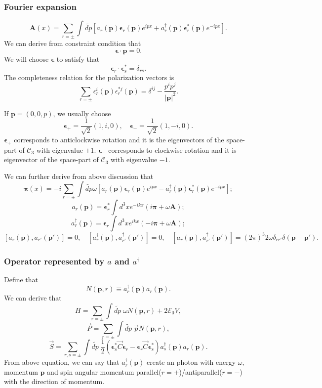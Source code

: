 \subsubsection{Fourier expansion}
\[\bm{A}(x) = \sum_{r = \pm} \int \widetilde{dp} [a_{r}(\bm{p}) \bm{\epsilon}_r(\bm{p})e^{ipx} + a^{\dagger}_{r}(\bm{p}) \bm{\epsilon}^*_r(\bm{p})e^{-ipx}].\]
We can derive from constraint condition that
\[\bm{\epsilon} \cdot \bm{p} = 0.\]
We will choose $\bm{\epsilon}$ to satisfy that
\[\bm{\epsilon}_r \cdot \bm{\epsilon}^*_s = \delta_{rs}.\]
The completeness relation for the polarization vectors is
\[\sum_{r=\pm} \epsilon_r^i(\bm{p}) \epsilon_r^{*j}(\bm{p}) = \delta^{ij} - \frac{p^ip^j}{|\bm{p}|^2}.\]
\begin{example}
If $\bm{p} = (0,0,p)$, we usually choose 
\[\bm{\epsilon}_{+} = \frac{1}{\sqrt{2}}(1,i,0) , \quad \bm{\epsilon}_{-} = \frac{1}{\sqrt{2}}(1,-i,0) .\]
$\bm{\epsilon}_{+}$ corresponds to anticlockwise rotation and it is the eigenvectors of the space-part of $\mathcal{C}_3$ with eigenvalue $+1$. $\bm{\epsilon}_{-}$ corresponds to clockwise rotation and it is eigenvector of the space-part of $\mathcal{C}_3$ with eigenvalue $- 1$.
\end{example}
\noindent
We can further derive from above discussion that
\[\bm{\pi}(x) = -i \sum_{r = \pm} \int \widetilde{dp} \omega [a_{r}(\bm{p}) \bm{\epsilon}_r(\bm{p})e^{ipx} - a^{\dagger}_{r}(\bm{p}) \bm{\epsilon}^*_r(\bm{p})e^{-ipx}];\]
\[a_r(\bm{p}) = \bm{\epsilon}^*_r \int d^3x e^{-ikx}(i\bm{\pi}+\omega\bm{A});\]
\[a^{\dagger}_r(\bm{p}) = \bm{\epsilon}_r \int d^3x e^{ikx}(-i\bm{\pi}+\omega\bm{A});\]
\[[a_r(\bm{p}),a_{r'}(\bm{p'})] = 0 , \quad [a^{\dagger}_r(\bm{p}),a^{\dagger}_{r'}(\bm{p'})] = 0 , \quad [a_r(\bm{p}),a^{\dagger}_{r'}(\bm{p'})] = (2\pi)^3 2\omega \delta_{rr'} \delta(\bm{p} - \bm{p}').\]

\subsubsection{Operator represented by $a$ and $a^{\dagger}$}
Define that
\[N(\bm{p},r) \equiv a^{\dagger}_{r}(\bm{p}) a_r(\bm{p}).\]
We can derive that
\[H = \sum_{r = \pm} \int \widetilde{dp} \; \omega N(\bm{p},r) + 2\mathcal{E}_0V,\]
\[\vec{P} = \sum_{r = \pm} \int \widetilde{dp} \; \vec{p} N(\bm{p},r) ,\]
\[\vec{S} = \sum_{r,s = \pm} \int \widetilde{dp} \; \frac{1}{2}(\bm{\epsilon}^*_{s} \vec{C}\bm{\epsilon}_{r} - \bm{\epsilon}_{r} \vec{C}\bm{\epsilon}^*_{s}) a^{\dagger}_{s}(\bm{p}) a_r(\bm{p}).\]
From above equation, we can say that $a^{\dagger}_r(\bm{p})$ create an photon with energy $\omega$, momentum $\bm{p}$ and spin angular momentum parallel($r=+$)/antiparallel($r=-$) with the direction of momentum.

